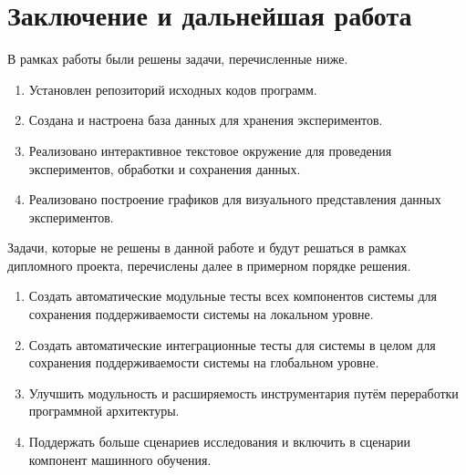 \section{Заключение и дальнейшая работа}
В рамках работы были решены задачи, перечисленные ниже.
\begin{enumerate}
    \item Установлен репозиторий исходных кодов программ.
    \item Создана и настроена база данных для хранения экспериментов.
    \item Реализовано интерактивное текстовое окружение для проведения экспериментов, обработки и сохранения данных.
    \item Реализовано построение графиков для визуального представления данных экспериментов.
\end{enumerate}

Задачи, которые не решены в данной работе и будут решаться в рамках дипломного проекта, перечислены далее в примерном порядке решения.
\begin{enumerate}
    \item Создать автоматические модульные тесты всех компонентов системы для сохранения поддерживаемости системы на локальном уровне.
    \item Создать автоматические интеграционные тесты для системы в целом для сохранения поддерживаемости системы на глобальном уровне.
    \item Улучшить модульность и расширяемость инструментария путём переработки программной архитектуры.
    \item Поддержать больше сценариев исследования и включить в сценарии компонент машинного обучения.
\end{enumerate}